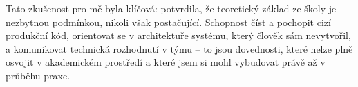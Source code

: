 Tato zkušenost pro mě byla klíčová: potvrdila, že teoretický základ ze školy je nezbytnou podmínkou, nikoli však postačující. Schopnost číst a pochopit cizí produkční kód, orientovat se v architektuře systému, který člověk sám nevytvořil, a komunikovat technická rozhodnutí v týmu -- to jsou dovednosti, které nelze plně osvojit v akademickém prostředí a které jsem si mohl vybudovat právě až v průběhu praxe.